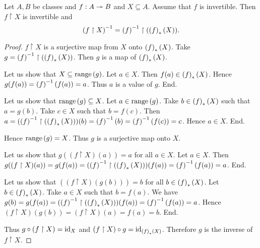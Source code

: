 \documentclass[../../set-theory/set-theory.tex]{subfiles}
\begin{document}
  \begin{forthel}
    \begin{proposition}
      Let $A, B$ be classes and $f : A \twoheadrightarrow B$ and $X \subseteq A$.
      Assume that $f$ is invertible.
      Then $f \restriction X$ is invertible and
      \[ \left(f\restriction X\right)^{-1} = \left(f\right)^{-1} \restriction (\left(f\right)_{*}(X)). \]
    \end{proposition}
    \begin{proof}
      $f \restriction X$ is a surjective map from $X$ onto $\left(f\right)_{*}(X)$.
      Take $g = \left(f\right)^{-1} \restriction (\left(f\right)_{*}(X))$.
      Then $g$ is a map of $\left(f\right)_{*}(X)$.

      Let us show that $X \subseteq \mathrm{range}\left(g\right)$.
        Let $a \in X$.
        Then $f(a) \in \left(f\right)_{*}(X)$.
        Hence $g(f(a)) = \left(f\right)^{-1}(f(a)) = a$.
        Thus $a$ is a value of $g$.
      End.

      Let us show that $\mathrm{range}\left(g\right) \subseteq X$.
        Let $a \in \mathrm{range}\left(g\right)$.
        Take $b \in \left(f\right)_{*}(X)$ such that $a = g(b)$.
        Take $c \in X$ such that $b = f(c)$.
        Then $a
          = (\left(f\right)^{-1} \restriction (\left(f\right)_{*}(X)))(b)
          = \left(f\right)^{-1}(b)
          = \left(f\right)^{-1}(f(c))
          = c$.
        Hence $a \in X$.
      End.

      Hence $\mathrm{range}\left(g\right) = X$.
      Thus $g$ is a surjective map onto $X$.

      Let us show that $g((f \restriction X)(a)) = a$ for all $a \in X$.
        Let $a \in X$.
        Then $g((f \restriction X)(a))
          = g(f(a))
          = (\left(f\right)^{-1} \restriction (\left(f\right)_{*}(X)))(f(a))
          = \left(f\right)^{-1}(f(a))
          = a$.
      End.

      Let us show that $((f \restriction X)(g(b))) = b$ for all $b \in \left(f\right)_{*}(X)$.
        Let $b \in \left(f\right)_{*}(X)$.
        Take $a \in X$ such that $b = f(a)$.
        We have $g(b)
          = g(f(a))
          = (\left(f\right)^{-1} \restriction (\left(f\right)_{*}(X)))(f(a))
          = \left(f\right)^{-1}(f(a))
          = a$.
        Hence $(f \restriction X)(g(b))
          = (f \restriction X)(a)
          = f(a)
          = b$.
      End.

      Thus $g \circ (f \restriction X) = \mathrm{id}_{X}$ and
      $(f \restriction X) \circ g = \mathrm{id}_{\left(f\right)_{*}(X)}$.
      Therefore $g$ is the inverse of $f \restriction X$.
    \end{proof}
  \end{forthel}
\end{document}

